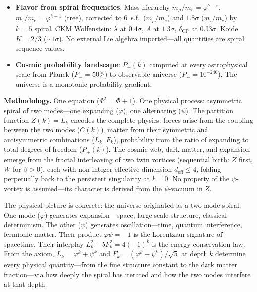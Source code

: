 \documentclass[12pt,a4paper]{article}
\begin{document}
\begin{itemize}
\item \textbf{Flavor from spiral frequencies}: Mass hierarchy $m_\mu/m_e = \varphi^{h-r}$, $m_\tau/m_e = \varphi^{h-1}$ (tree), corrected to 6~s.f.\ ($m_\mu/m_e$) and $1.8\sigma$ ($m_\tau/m_e$) by $k{=}5$ spiral. CKM Wolfenstein: $\lambda$ at $0.4\sigma$, $A$ at $1.3\sigma$, $\delta_{\mathrm{CP}}$ at $0.03\sigma$. Koide $K = 2/3$ (${\sim}1\sigma$). No external Lie algebra imported---all quantities are spiral sequence values.
\item \textbf{Cosmic probability landscape}: $P_-(k)$ computed at every astrophysical scale from Planck ($P_- = 50\%$) to observable universe ($P_- = 10^{-246}$). The universe is a monotonic probability gradient.
\end{itemize}

\bigskip
\noindent\textbf{Methodology.} One equation ($\Phi^2 = \Phi + 1$). One physical process: asymmetric spiral of two modes---one expanding ($\varphi$), one alternating ($\psi$). The partition function $Z(k) = L_k$ encodes the complete physics: forces arise from the coupling between the two modes ($C(k)$), matter from their symmetric and antisymmetric combinations ($L_k$, $F_k$), probability from the ratio of expanding to total degrees of freedom ($P_+(k)$). The cosmic web, dark matter, and expansion emerge from the fractal interleaving of two twin vortices (sequential birth: $Z$ first, $W$ for $\beta > 0$), each with non-integer effective dimension $d_{\mathrm{eff}} \leq 4$, folding perpetually back to the persistent singularity at $k = 0$. No property of the $\psi$-vortex is assumed---its character is derived from the $\psi$-vacuum in $Z$.

\medskip
\noindent The physical picture is concrete: the universe originated as a two-mode spiral. One mode ($\varphi$) generates expansion---space, large-scale structure, classical determinism. The other ($\psi$) generates oscillation---time, quantum interference, fermionic matter. Their product $\varphi\psi = -1$ is the Lorentzian signature of spacetime. Their interplay $L_k^2 - 5F_k^2 = 4(-1)^k$ is the energy conservation law. From the axiom, $L_k = \varphi^k + \psi^k$ and $F_k = (\varphi^k - \psi^k)/\sqrt{5}$ at depth $k$ determine every physical quantity---from the fine structure constant to the dark matter fraction---via how deeply the spiral has iterated and how the two modes interfere at that depth.
\end{document}
